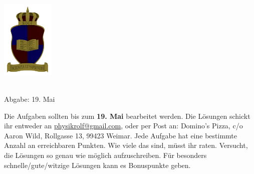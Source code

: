 \documentclass[a4paper]{article}
\numberwithin{equation}{Exercise}
\begin{document}
	\vspace*{-2cm}
	\parbox{4cm}{\includegraphics[width=2.5cm]{../images/ROLF4.png}}
	\parbox{10.6cm}{ \\ Abgabe: 19. Mai \\ \vspace*{-.5cm} }
	
	

\thispagestyle{empty}
\begin{framed}
	\noindent
	\scriptsize
	Die Aufgaben sollten bis zum \textbf{19. Mai} bearbeitet werden. Die Lösungen schickt ihr entweder an \href{mailto:physikrolf@gmail.com}{physikrolf@gmail.com}, oder per Post an: Domino's Pizza, c/o Aaron Wild, Rollgasse 13, 99423 Weimar.
	Jede Aufgabe hat eine bestimmte Anzahl an erreichbaren Punkten. Wie viele das sind, müsst ihr raten. Versucht, die Lösungen so genau wie möglich aufzuschreiben. Für besonders schnelle/gute/witzige Lösungen kann es Bonuspunkte geben.
\end{framed}

\noindent




\end{document}
